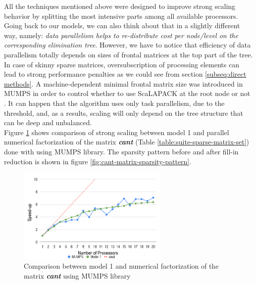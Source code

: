 All the techniques mentioned above were designed to improve strong scaling behavior by splitting the most intensive parts among all available processors. Going back to our models, we can also think about that in a slightly different way, namely: \textit{data parallelism helps to re-distribute cost per node/level on the corresponding elimination tree}. However, we have to notice that efficiency of data parallelism totally depends on sizes of frontal matrices at the top part of the tree. In case of skinny sparse matrices, oversubscription of processing elements can lead to strong performance penalties as we could see from section \ref{subseq:direct methods}. A machine-dependent minimal frontal matrix size was introduced in MUMPS in order to control whether to use ScaLAPACK at the root node or not \cite{mumps-manual}. It can happen that the algorithm uses only task parallelism, due to the threshold, and, as a results, scaling will only depend on the tree structure that can be deep and unbalanced.\\


Figure \ref{fig:model-1-vs-mumps} shows comparison of strong scaling between model 1 and parallel numerical factorization of the matrix \textit{\textbf{cant}} (Table \ref{table:suite-sparse-matrix-set}) done with using MUMPS library. The sparsity pattern before and after fill-in reduction is shown in figure \ref{fig:cant-matrix-sparsity-pattern}. 


\begin{figure}[htpb]
  \centering
  \includegraphics[width=0.65\textwidth]{figures/chapter-2/model-1-vs-mumps.png}
\caption{Comparison between model 1 and numerical factorization of the matrix \textit{\textbf{cant}} using MUMPS library}
\label{fig:model-1-vs-mumps}
\end{figure}


